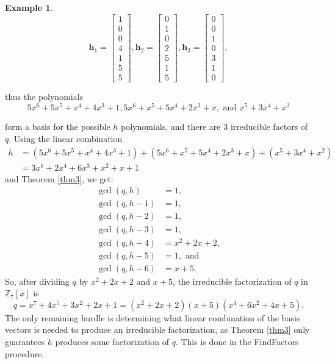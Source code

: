 \documentclass{article}
\theoremstyle{definition}
\newtheorem{exa}[thm]{Example}
\begin{document}
\begin{exa}
    \begin{equation*}
        \mathbf{h}_1 =   \begin{bmatrix}
        1 \\ 0\\ 0\\ 4\\ 1\\ 5\\5
        \end{bmatrix},
                \mathbf{h}_2 =   \begin{bmatrix}
        0 \\1 \\0 \\2\\ 5\\ 1\\ 5
        \end{bmatrix},
        \mathbf{h}_3 =   \begin{bmatrix}
        0\\ 0\\ 1\\ 0\\ 3 \\1 \\ 0
        \end{bmatrix},
    \end{equation*}
    
    thus the polynomials \[ 5x^6+5x^5+x^4+4x^3+1, 5x^6+x^5+5x^4+2x^3+x, \text{ and } x^5+3x^4+x^2 \]
    
    form a basis for the possible $h$ polynomials, and there are 3 irreducible factors of $q$. Using the linear combination
    \[ \begin{aligned}
        h &= (5x^6+5x^5+x^4+4x^3+1) + (5x^6+x^5+5x^4+2x^3+x) +  (x^5+3x^4+x^2) \\
        &= 3x^6 + 2x^4 + 6x^3 + x^2 + x + 1
        \end{aligned} \] 
    and Theorem \ref{thm3}, we get:
    \begin{align*}
        \gcd(q, h) &= 1, \\
        \gcd(q, h-1) &= 1, \\
        \gcd(q, h-2) &= 1,\\
        \gcd(q, h-3) &= 1,\\
        \gcd(q, h-4) &= x^2+2x+2,\\
        \gcd(q, h-5) &= 1, \text{ and}\\
        \gcd(q, h-6) &= x + 5.
    \end{align*}
    So, after dividing $q$ by $x^2+2x+2$ and $x + 5$, the irreducible factorization of $q$ in $\mathbb{Z}_7[x]$ is \[ q= x^7+4x^5+3x^2+2x+1 = (x^2+2x+2)(x + 5)(x^4 + 6x^2 + 4x + 5).\]
    The only remaining hurdle is determining what linear combination of the basis vectors is needed to produce an irreducible factorization, as Theorem \ref{thm3} only guarantees $h$ produces some factorization of $q$. This is done in the FindFactors procedure.
    

\end{exa}
\end{document}
